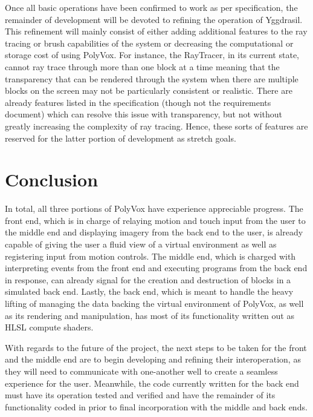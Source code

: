 \documentclass[onecolumn, draftclsnofoot,10pt, compsoc]{IEEEtran}
\begin{document}
Once all basic operations have been confirmed to work as per specification, the remainder of development will be devoted to refining the operation of Yggdrasil. This refinement will mainly consist of either adding additional features to the ray tracing or brush capabilities of the system or decreasing the computational or storage cost of using PolyVox. For instance, the RayTracer, in its current state, cannot ray trace through more than one block at a time meaning that the transparency that can be rendered through the system when there are multiple blocks on the screen may not be particularly consistent or realistic. There are already features listed in the specification (though not the requirements document) which can resolve this issue with transparency, but not without greatly increasing the complexity of ray tracing. Hence, these sorts of features are reserved for the latter portion of development as stretch goals.

\section{Conclusion}
In total, all three portions of PolyVox have experience appreciable progress. The front end, which is in charge of relaying motion and touch input from the user to the middle end and displaying imagery from the back end to the user, is already capable of giving the user a fluid view of a virtual environment as well as registering input from motion controls. The middle end, which is charged with interpreting events from the front end and executing programs from the back end in response, can already signal for the creation and destruction of blocks in a simulated back end. Lastly, the back end, which is meant to handle the heavy lifting of managing the data backing the virtual environment of PolyVox, as well as its rendering and manipulation, has most of its functionality written out as HLSL compute shaders.

With regards to the future of the project, the next steps to be taken for the front and the middle end are to begin developing and refining their interoperation, as they will need to communicate with one-another well to create a seamless experience for the user. Meanwhile, the code currently written for the back end must have its operation tested and verified and have the remainder of its functionality coded in prior to final incorporation with the middle and back ends.
\end{document}
